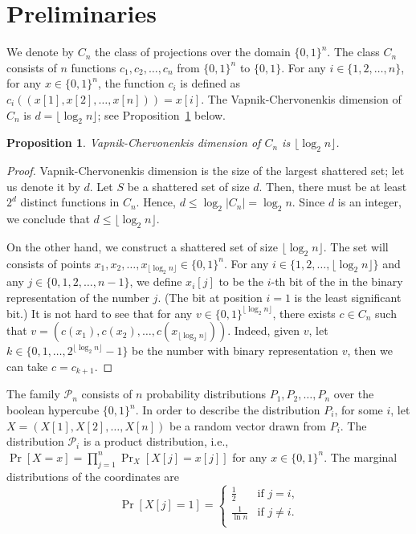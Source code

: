 \documentclass[10pt]{article}
\newtheorem{proposition}{Proposition}
\renewcommand{\P}{\mathcal{P}}
\begin{document}
\section{Preliminaries}

We denote by $C_n$ the class of projections over the domain $\{0,1\}^n$. The
class $C_n$ consists of $n$ functions $c_1, c_2, \dots, c_n$ from $\{0,1\}^n$ to
$\{0,1\}$. For any $i \in \{1,2,\dots,n\}$, for any $x \in \{0,1\}^n$,
the function $c_i$ is defined as $c_i((x[1], x[2], \dots, x[n])) = x[i]$.
The Vapnik-Chervonenkis dimension of $C_n$ is $d = \lfloor \log_2 n \rfloor$; see
Proposition~\ref{proposition:vc-dimension-projections} below.

\begin{proposition}
\label{proposition:vc-dimension-projections}
Vapnik-Chervonenkis dimension of $C_n$ is $\lfloor \log_2 n \rfloor$.
\end{proposition}

\begin{proof}
Vapnik-Chervonenkis dimension is the size of the largest shattered set; let us
denote it by $d$. Let $S$ be a shattered set of size $d$. Then, there must be at
least $2^d$ distinct functions in $C_n$. Hence, $d \le \log_2 |C_n| =
\log_2 n$. Since $d$ is an integer, we conclude that $d \le \lfloor \log_2 n
\rfloor$.

On the other hand, we construct a shattered set of size $\lfloor \log_2 n
\rfloor$. The set will consists of points $x_1, x_2, \dots, x_{\lfloor \log_2 n
\rfloor} \in \{0,1\}^n$. For any $i \in \{1,2,\dots,\lfloor \log_2 n \rfloor\}$
and any $j \in \{0,1,2,\dots,n-1\}$, we define $x_i[j]$ to be the $i$-th bit of the
in the binary representation of the number $j$. (The bit at position $i=1$ is the
least significant bit.) It is not hard to see that for any $v \in
\{0,1\}^{\lfloor \log_2 n \rfloor}$, there exists $c \in C_n$ such that $v =
(c(x_1), c(x_2), \dots, c(x_{\lfloor \log_2 n \rfloor}))$. Indeed, given $v$,
let $k \in \{0,1,\dots,2^{\lfloor \log_2 n \rfloor} - 1\}$ be the number with
binary representation $v$, then we can take $c = c_{k+1}$.
\end{proof}

The family $\P_n$ consists of $n$ probability distributions $P_1, P_2, \dots,
P_n$ over the boolean hypercube $\{0,1\}^n$. In order to describe the
distribution $P_i$, for some $i$, let $X = (X[1], X[2], \dots, X[n])$ be a
random vector drawn from $P_i$. The distribution $\P_i$ is a product
distribution, i.e., $\Pr[X = x] = \prod_{j=1}^n \Pr_{X}[X[j] = x[j]]$ for any $x
\in \{0,1\}^n$. The marginal distributions of the coordinates are
$$
\Pr[X[j] = 1] =
\begin{cases}
\frac{1}{2} & \text{if $j = i$,} \\
\frac{1}{\ln n} & \text{if $j\neq i$.} \\
\end{cases}
$$
\end{document}
